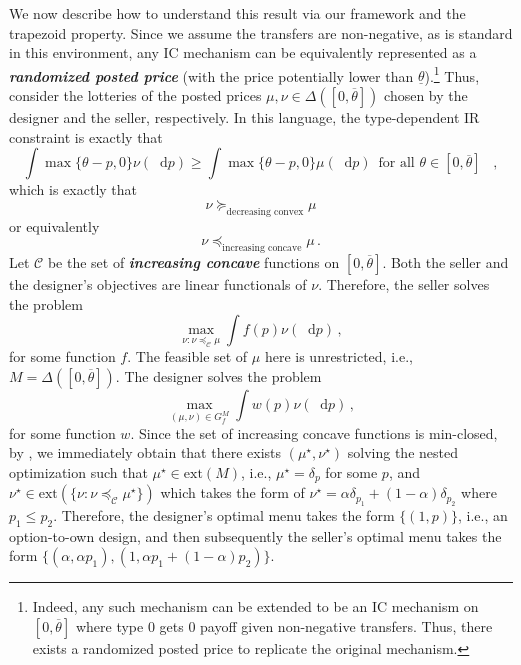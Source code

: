 \documentclass[12pt,letterpaper]{article}
\newenvironment{original}{\color{black}}{}
\theoremstyle{plain}
\theoremstyle{definition}
\theoremstyle{remark}
\newcommand{\C}{\mathcal{C}}
\newcommand{\Ext}{\mathrm{ext}}
\renewcommand*\d{\mathop{}\!\mathrm{d}}
\theoremstyle{definition}
\begin{document}
\begin{original}
We now describe how to understand this result via our framework and the trapezoid property. Since we assume the transfers are non-negative, as is standard in this environment, any IC mechanism can be equivalently represented as a \textit{\textbf{randomized posted price}} (with the price potentially lower than $\underline{\theta}$).\footnote{Indeed, any such mechanism can be extended to be an IC mechanism on $[0,\overline{\theta}]$ where type $0$ gets $0$ payoff given non-negative transfers. Thus, there exists a randomized posted price to replicate the original mechanism.} Thus, consider the lotteries of the posted prices $\mu, \nu \in \Delta([0,\overline{\theta}])$ chosen by the designer and the seller, respectively. In this language, the type-dependent IR constraint is exactly that
\[\int \max\{\theta - p, 0\} \nu(\d p) \geq \int \max\{\theta - p, 0\} \mu(\d p) \,\text{ for all $\theta \in [0,\overline{\theta}]$ }\,,\]
which is exactly that
\[\nu \succeq_{\text{decreasing convex}} \mu \]
or equivalently
\[\nu \preceq_{\text{increasing concave}} \mu\,.\]
Let $\C$ be the set of \textit{\textbf{increasing concave}} functions on $[0, \overline{\theta}]$. Both the seller and the designer's objectives are linear functionals of $\nu$. Therefore, the seller solves the problem
\[\max_{\nu: \nu \preceq_\C \mu} \int f(p) \nu(\d p)\,,\]
for some function $f$. The feasible set of $\mu$ here is unrestricted, i.e., $M = \Delta([0, \overline{\theta}])$. The designer solves the problem
\[\max_{(\mu, \nu) \in G^M_f} \int w(p) \nu(\d p)\,,\]
for some function $w$. Since the set of increasing concave functions is min-closed, by
, we immediately obtain that there exists $(\mu^\star, \nu^\star)$ solving the nested optimization such that $\mu^\star \in \Ext(M)$, i.e., $\mu^\star = \delta_p$ for some $p$, and $\nu^\star \in \Ext(\{\nu: \nu \preceq_\C \mu^\star\})$ which takes the form of $\nu^\star = \alpha \delta_{p_1} + (1 - \alpha) \delta_{p_2}$ where $p_1 \leq p_2$. Therefore, the designer's optimal menu takes the form $\{(1, p)\}$, i.e., an option-to-own design, and then subsequently the seller's optimal menu takes the form $\{(\alpha, \alpha p_1), (1, \alpha p_1 + (1 - \alpha) p_2)\}$.
\end{original}
\end{document}

